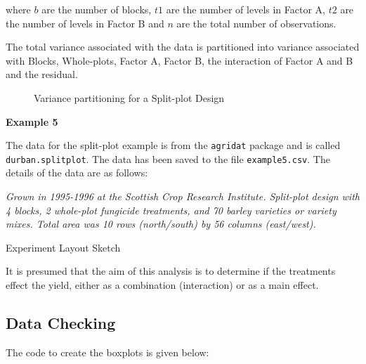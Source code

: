 \documentclass[a4paper, 10pt, fleqn, twosided]{memoir}
\begin{document}
where $b$ are the number of blocks, $t1$ are the number of levels in Factor A, $t2$ are the number of levels in Factor
B and $n$ are the total number of observations.

The total variance associated with the data is partitioned into variance associated with Blocks, Whole-plots, Factor A,
Factor B, the interaction of Factor A and B and the residual.

\begin{figure}[!hbtp]
\centering
{}
\caption{Variance partitioning for a Split-plot Design}
\label{fig:spbucket}
\end{figure}

\textbf{Example 5}

The data for the split-plot example is from the \texttt{agridat} package \cite{agridat} and is called
\texttt{durban.splitplot}. The data has been saved to the file \texttt{example5.csv}. The details of the data are as
follows:

\textit{Grown in 1995-1996 at the Scottish Crop Research Institute.   Split-plot design with 4 blocks,  2 whole-plot
fungicide treatments, and 70 barley varieties or variety mixes.  Total area was 10 rows (north/south) by 56 columns
(east/west).}


\begin{application}{Experiment Layout Sketch}
\vspace{10cm}
\end{application}

It is presumed that the aim of this analysis is to determine if the treatments effect the yield, either as a
combination (interaction) or as a main effect.

\clearpage
\subsection{Data Checking}

The code to create the boxplots is given below:
\end{document}
